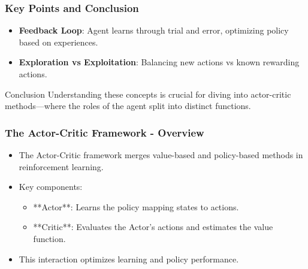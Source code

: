 \documentclass[aspectratio=169]{beamer}
\begin{document}
\begin{frame}[fragile]
    \frametitle{Key Points and Conclusion}
    \begin{itemize}
        \item \textbf{Feedback Loop}: Agent learns through trial and error, optimizing policy based on experiences.
        \item \textbf{Exploration vs Exploitation}: Balancing new actions vs known rewarding actions.
    \end{itemize}

    \begin{block}{Conclusion}
        Understanding these concepts is crucial for diving into actor-critic methods—where the roles of the agent split into distinct functions.
    \end{block}
\end{frame}

\begin{frame}[fragile]
    \frametitle{The Actor-Critic Framework - Overview}
    \begin{itemize}
        \item The Actor-Critic framework merges value-based and policy-based methods in reinforcement learning.
        \item Key components:
        \begin{itemize}
            \item **Actor**: Learns the policy mapping states to actions.
            \item **Critic**: Evaluates the Actor's actions and estimates the value function.
        \end{itemize}
        \item This interaction optimizes learning and policy performance.
    \end{itemize}
\end{frame}
\end{document}
